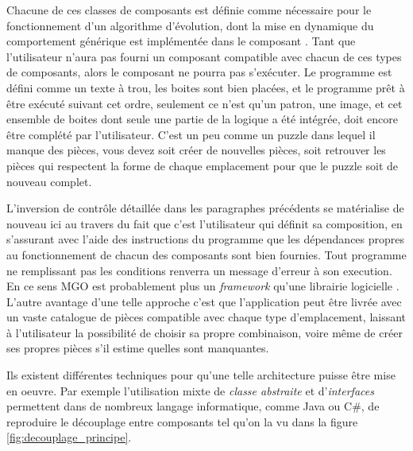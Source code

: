 Chacune de ces classes de composants est définie comme nécessaire pour le fonctionnement d'un algorithme d'évolution, dont la mise en dynamique du comportement générique est implémentée dans le composant . Tant que l'utilisateur n'aura pas fourni un composant compatible avec chacun de ces types de composants, alors le composant  ne pourra pas s'exécuter. Le programme est défini comme un texte à trou, les boites sont bien placées, et le programme prêt à être exécuté suivant cet ordre, seulement ce n'est qu'un patron, une image, et cet ensemble de boites dont seule une partie de la logique a été intégrée, doit encore être complété par l'utilisateur. C'est un peu comme un puzzle dans lequel il manque des pièces, vous devez soit créer de nouvelles pièces, soit retrouver les pièces qui respectent la forme de chaque emplacement pour que le puzzle soit de nouveau complet.

L'inversion de contrôle détaillée dans les paragraphes précédents se matérialise de nouveau ici au travers du fait que c'est l'utilisateur qui définit sa composition, en s'assurant avec l'aide des instructions du programme que les dépendances propres au fonctionnement de chacun des composants sont bien fournies. Tout programme ne remplissant pas les conditions renverra un message d'erreur à son execution. En ce sens MGO est probablement plus un \textit{framework} qu'une librairie logicielle . L'autre avantage d'une telle approche c'est que l'application peut être livrée avec un vaste catalogue de pièces compatible avec chaque type d'emplacement, laissant à l'utilisateur la possibilité de choisir sa propre combinaison, voire même de créer ses propres pièces s'il estime quelles sont manquantes.

Ils existent différentes techniques pour qu'une telle architecture puisse être mise en oeuvre. Par exemple l'utilisation mixte de \textit{classe abstraite} et d'\textit{interfaces} permettent dans de nombreux langage informatique, comme Java ou C\#, de reproduire le découplage entre composants tel qu'on la vu dans la figure \ref{fig:decouplage_principe}.

